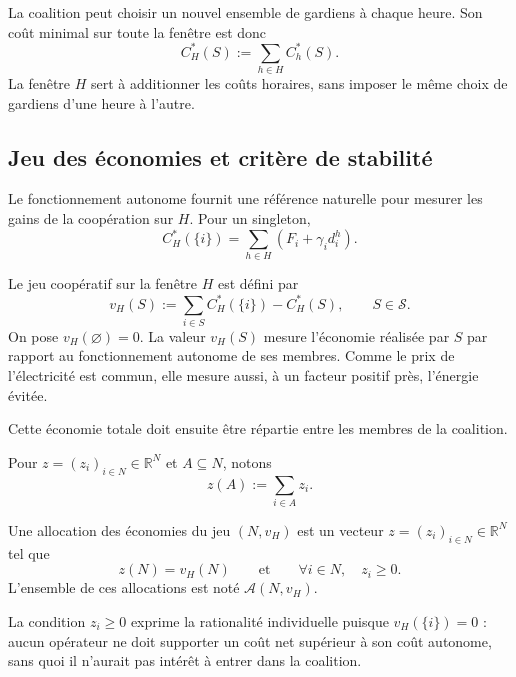 La coalition peut choisir un nouvel ensemble de gardiens à chaque heure. Son
coût minimal sur toute la fenêtre est donc
\begin{equation}
    C_H^*(S)
    :=
    \sum_{h\in H}C_h^*(S).
    \label{eq:cout_horaire_principal}
\end{equation}
La fenêtre \(H\) sert à additionner les coûts horaires, sans imposer le même
choix de gardiens d'une heure à l'autre.


\subsection{Jeu des économies et critère de stabilité}
\label{subsec:modele_jeu_economies}

Le fonctionnement autonome fournit une référence naturelle pour mesurer les
gains de la coopération sur \(H\). Pour un singleton,
\[
    C_H^*(\{i\})
    =\sum_{h\in H}\left(F_i+\gamma_i d_i^h\right).
\]

\begin{definition}
\label{def:jeu_economies}
Le jeu coopératif sur la fenêtre $H$ est défini par
\begin{equation}
    v_H(S)
    :=
    \sum_{i\in S}C_H^*(\{i\})-C_H^*(S),
    \qquad S\in\mathcal S.
    \label{eq:jeu_principal}
\end{equation}
On pose \(v_H(\varnothing)=0\). La valeur \(v_H(S)\) mesure l'économie réalisée
par \(S\) par rapport au fonctionnement autonome de ses membres. Comme le prix
de l'électricité est commun, elle mesure aussi, à un facteur positif près,
l'énergie évitée.
\end{definition}

Cette économie totale doit ensuite être répartie entre les membres de la
coalition.

Pour $z=(z_i)_{i\in N}\in\mathbb R^N$ et $A\subseteq N$, notons
\[
    z(A):=\sum_{i\in A}z_i.
\]

\begin{definition}
Une allocation des économies du jeu $(N,v_H)$ est un vecteur
$z=(z_i)_{i\in N}\in\mathbb R^N$ tel que
\[
    z(N)=v_H(N)
    \qquad\text{et}\qquad
    \forall i \in N,\quad
    z_i\geqslant0.
\]
L'ensemble de ces allocations est noté $\mathcal A(N,v_H)$.
\end{definition}

La condition $z_i\geqslant0$ exprime la rationalité individuelle puisque
$v_H(\{i\})=0$ : aucun opérateur ne doit supporter un coût net supérieur à
son coût autonome, sans quoi il n'aurait pas intérêt à entrer dans la coalition.

